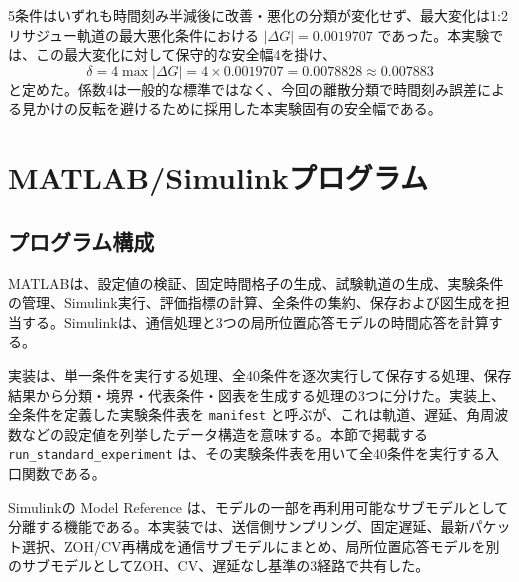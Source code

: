 \documentclass[11pt,a4paper]{article}
\newcommand{\code}[1]{\texttt{#1}}
\begin{document}
5条件はいずれも時間刻み半減後に改善・悪化の分類が変化せず、最大変化は1:2リサジュー軌道の最大悪化条件における $|\Delta G|=0.0019707$ であった。本実験では、この最大変化に対して保守的な安全幅4を掛け、
\begin{equation}
 \delta=4\max |\Delta G|
 =4\times0.0019707
 =0.0078828\approx0.007883
\end{equation}
と定めた。係数4は一般的な標準ではなく、今回の離散分類で時間刻み誤差による見かけの反転を避けるために採用した本実験固有の安全幅である。

\section{MATLAB/Simulinkプログラム}

\subsection{プログラム構成}

MATLABは、設定値の検証、固定時間格子の生成、試験軌道の生成、実験条件の管理、Simulink実行、評価指標の計算、全条件の集約、保存および図生成を担当する。Simulinkは、通信処理と3つの局所位置応答モデルの時間応答を計算する。

実装は、単一条件を実行する処理、全40条件を逐次実行して保存する処理、保存結果から分類・境界・代表条件・図表を生成する処理の3つに分けた。実装上、全条件を定義した実験条件表を \code{manifest} と呼ぶが、これは軌道、遅延、角周波数などの設定値を列挙したデータ構造を意味する。本節で掲載する \code{run\_standard\_experiment} は、その実験条件表を用いて全40条件を実行する入口関数である。

Simulinkの Model Reference は、モデルの一部を再利用可能なサブモデルとして分離する機能である。本実装では、送信側サンプリング、固定遅延、最新パケット選択、ZOH/CV再構成を通信サブモデルにまとめ、局所位置応答モデルを別のサブモデルとしてZOH、CV、遅延なし基準の3経路で共有した。

\begin{center}
\end{center}
\end{document}
